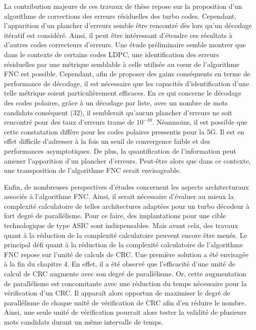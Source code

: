 La contribution majeure de ces travaux de thèse repose sur la proposition d'un algorithme de corrections des erreurs 
résiduelles des turbo codes. Cependant, l'apparition d'un plancher d'erreurs semble être rencontré dès lors qu'un 
décodage itératif est considéré. Ainsi, il peut être intéressant d'étendre ces résultats à
d'autres codes correcteurs d'erreurs. Une étude préliminaire semble montrer que dans le 
contexte de certains codes LDPC, une identification des erreurs résiduelles par une métrique semblable à celle 
utilisée au cœur de l'algorithme FNC est possible. Cependant, afin de proposer des gains conséquents en terme de performance de 
décodage, il est nécessaire que les capacités d'identification d'une telle métrique soient particulièrement
efficaces. En ce qui concerne le décodage des codes polaires, grâce à un décodage par liste, avec un nombre de mots
candidats conséquent (32), il semblerait qu'aucun plancher d'erreurs ne soit rencontré pour des taux d'erreurs trame de 
$10^{-10}$. Néanmoins, il est possible que cette constatation diffère pour les codes polaires pressentis pour la 5G. Il est 
en effet difficile d'adresser à la fois un seuil de convergence faible et des performances asymptotiques. De plus, 
la quantification de l'information peut amener l'apparition d'un plancher d'erreurs. Peut-être alors que dans ce 
contexte, une transposition de l'algorithme FNC serait envisageable.


Enfin, de nombreuses perspectives d'études concernent les aspects architecturaux associés à l'algorithme
FNC. Ainsi, il serait nécessaire d'évaluer au mieux la complexité calculatoire de telles architectures adaptées pour un turbo
décodeur à fort degré de parallélisme. Pour ce faire, des implantations pour une cible technologique de type ASIC sont 
indispensables. Mais avant cela, des travaux quant à la réduction de la complexité calculatoire peuvent encore être
menés. Le principal défi quant à la réduction de la complexité calculatoire de l'algorithme FNC repose sur l'unité de
calculs de CRC. Une première solution a été envisagée à la fin du chapitre 4. En effet, il a été observé que l'efficacité
d'une unité de calcul de CRC augmente avec son degré de parallélisme. Or, cette augmentation de parallélisme est 
concomitante avec une réduction du temps nécessaire pour la vérification d'un CRC. Il apparaît alors opportun de maximiser
le degré de parallélisme de chaque unité de vérification de CRC afin d'en réduire le nombre. Ainsi, une 
seule unité de vérification pourrait alors tester la validité de plusieurs mots candidats durant un même intervalle de temps.

